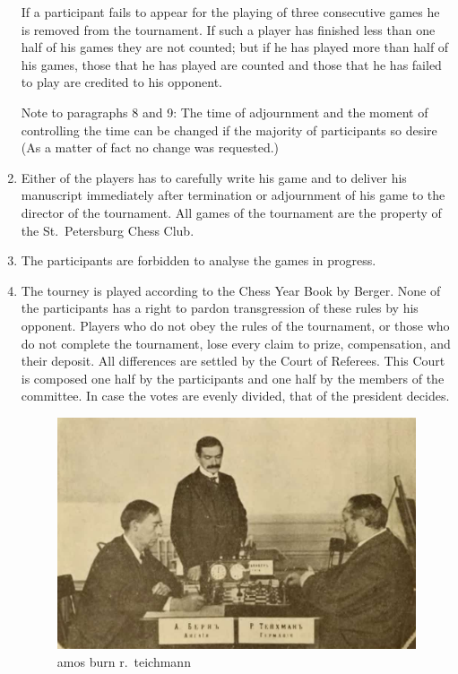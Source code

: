 \begin{enumerate}
If a participant fails to appear for the playing of three consecutive games he is removed from the tournament. If such a player has finished less than one half of his games they are not counted; but if he has played more than half of his games, those that he has played are counted and those that he has failed to play are credited to his opponent.

Note to paragraphs 8 and 9: The time of adjournment and the moment of controlling the time can be changed if the majority of participants so desire (As a matter of fact no change was requested.)

\item Either of the players has to carefully write his game and to deliver his manuscript immediately after termination or adjournment of his game to the director of the tournament. All games of the tournament are the property of the St.~Petersburg Chess Club.

\item The participants are forbidden to analyse the games in progress.

\item The tourney is played according to the Chess Year Book by Berger. None of the participants has a right to pardon transgression of these rules by his opponent. Players who do not obey the rules of the tournament, or those who do not complete the tournament, lose every claim to prize, compensation, and their deposit. All differences are settled by the Court of Referees. This Court is composed one half by the participants and one half by the members of the committee. In case the votes are evenly divided, that of the president decides.

\begin{figure}[h]
\centering
\includegraphics[width=\textwidth]
{img/i5_burn-teichmann.jpg}\\
\small\sc
amos burn \hspace{5cm} r.~teichmann
\end{figure}


\end{enumerate}
